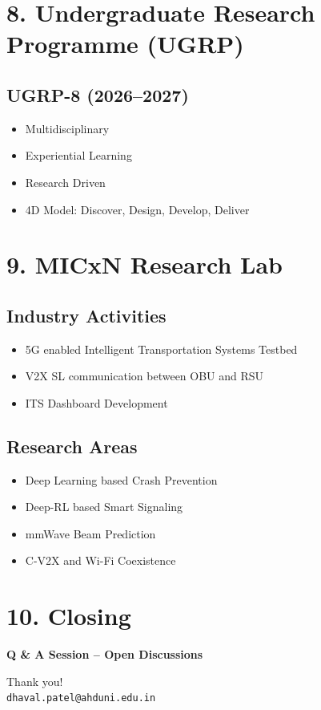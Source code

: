 \documentclass[11pt]{article}
\begin{document}
\section*{8. Undergraduate Research Programme (UGRP)}

\subsection*{UGRP-8 (2026–2027)}

\begin{itemize}
    \item Multidisciplinary
    \item Experiential Learning
    \item Research Driven
    \item 4D Model: Discover, Design, Develop, Deliver
\end{itemize}

\section*{9. MICxN Research Lab}

\subsection*{Industry Activities}

\begin{itemize}
    \item 5G enabled Intelligent Transportation Systems Testbed
    \item V2X SL communication between OBU and RSU
    \item ITS Dashboard Development
\end{itemize}

\subsection*{Research Areas}

\begin{itemize}
    \item Deep Learning based Crash Prevention
    \item Deep-RL based Smart Signaling
    \item mmWave Beam Prediction
    \item C-V2X and Wi-Fi Coexistence
\end{itemize}

\section*{10. Closing}

\begin{center}
\textbf{Q \& A Session – Open Discussions}
\end{center}

\vspace{0.5cm}

\noindent
Thank you!\\
\texttt{dhaval.patel@ahduni.edu.in}

\end{document}
